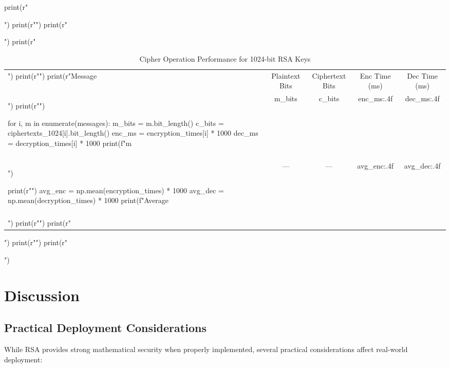 \documentclass[a4paper, 11pt]{article}
\begin{document}
\begin{pycode}
print(r"\begin{table}[htbp]")
print(r"\centering")
print(r"\caption{Cipher Operation Performance for 1024-bit RSA Keys}")
print(r"\begin{tabular}{lcccc}")
print(r"\toprule")
print(r"Message & Plaintext Bits & Ciphertext Bits & Enc Time (ms) & Dec Time (ms) \\")
print(r"\midrule")

for i, m in enumerate(messages):
    m_bits = m.bit_length()
    c_bits = ciphertexts_1024[i].bit_length()
    enc_ms = encryption_times[i] * 1000
    dec_ms = decryption_times[i] * 1000
    print(f"{m} & {m_bits} & {c_bits} & {enc_ms:.4f} & {dec_ms:.4f} \\\\")

print(r"\midrule")
avg_enc = np.mean(encryption_times) * 1000
avg_dec = np.mean(decryption_times) * 1000
print(f"Average & --- & --- & {avg_enc:.4f} & {avg_dec:.4f} \\\\")
print(r"\bottomrule")
print(r"\end{tabular}")
print(r"\label{tab:performance}")
print(r"\end{table}")
\end{pycode}

\section{Discussion}

\subsection{Practical Deployment Considerations}

While RSA provides strong mathematical security when properly implemented, several practical
considerations affect real-world deployment:
\end{document}

